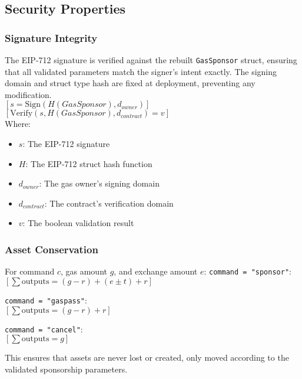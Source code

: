 %

\subsection{Security Properties}
\subsubsection{Signature Integrity}
The EIP-712 signature is verified against the rebuilt \texttt{GasSponsor} struct, ensuring that all
validated parameters match the signer's intent exactly. The signing domain and struct type hash are
fixed at deployment, preventing any modification.\\

$[ s = \text{Sign}(H(GasSponsor), d_{owner}) ]$
$[ \text{Verify}(s, H(GasSponsor), d_{contract}) = v ]$\\

Where:
\begin{itemize}
\item $s$: The EIP-712 signature
\item $H$: The EIP-712 struct hash function
\item $d_{owner}$: The gas owner's signing domain
\item $d_{contract}$: The contract's verification domain
\item $v$: The boolean validation result
\end{itemize}


\subsubsection{Asset Conservation}


For command $c$, gas amount $g$, and exchange amount $e$:
\texttt{command = "sponsor"}:\\

$[ \sum \text{outputs} = (g - r) + (e \pm t) + r ]$

\texttt{command = "gaspass"}:\\

$[ \sum \text{outputs} = (g - r) + r ]$

\texttt{command = "cancel"}:\\

$[ \sum \text{outputs} = g ]$

This ensures that assets are never lost or created, only moved according to the
validated sponsorship parameters.





